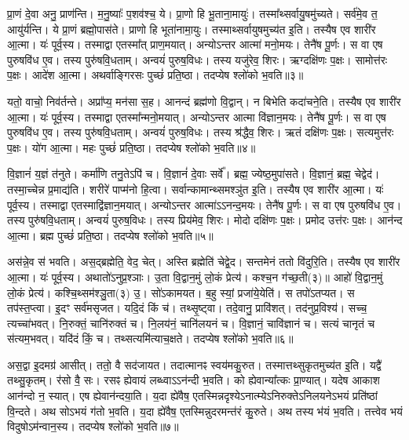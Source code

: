 प्रा॒णं दे॒वा अनु॒ प्राण॑न्ति। 
म॒नु॒ष्याः᳚ प॒शव॑श्च॒ ये। 
प्रा॒णो हि भू॒ताना॒मायुः॑। 
तस्मा᳚थ्सर्वायु॒षमु॑च्यते। 
सर्व॑मे॒व त॒ आयु॑र्\mbox{}यन्ति। 
ये प्रा॒णं ब्रह्मो॒पास॑ते। 
प्राणो हि भूता॑नामा॒युः। 
तस्माथ्सर्वायुषमुच्य॑त इ॒ति। 
तस्यैष एव शारी॑र आ॒त्मा। 
यः॑ पूर्व॒स्य। 
तस्माद्वा एतस्मा᳚त् प्राण॒मयात्। 
अन्योऽन्तर आत्मा॑ मनो॒मयः। 
तेनै॑ष पू॒र्णः। 
स वा एष पुरुषवि॑ध ए॒व। 
तस्य पुरु॑षवि॒धताम्। 
अन्वयं॑ पुरुष॒विधः। 
तस्य यजु॑रेव॒ शिरः। 
ऋग्दक्षि॑णः प॒क्षः। 
सामोत्त॑रः प॒क्षः। 
आदे॑श आ॒त्मा। 
अथर्वाङ्गिरसः पुच्छं॑ प्रति॒ष्ठा। 
तदप्येष श्लो॑को भ॒वति॥३॥

यतो॒ वाचो॒ निव॑र्तन्ते। 
अप्रा᳚प्य॒ मन॑सा स॒ह। 
आनन्दं ब्रह्म॑णो वि॒द्वान्। 
न बिभेति कदा॑चने॒ति। 
तस्यैष एव शारी॑र आ॒त्मा। 
यः॑ पूर्व॒स्य। 
तस्माद्वा एतस्मा᳚न्मनो॒मयात्। 
अन्योऽन्तर आत्मा वि॑ज्ञान॒मयः। 
तेनै॑ष पू॒र्णः। 
स वा एष पुरुषवि॑ध ए॒व। 
तस्य पुरु॑षवि॒धताम्। 
अन्वयं॑ पुरुष॒विधः। 
तस्य श्र॑द्धैव॒ शिरः। 
ऋतं दक्षि॑णः प॒क्षः। 
सत्यमुत्त॑रः प॒क्षः। 
यो॑ग आ॒त्मा। 
महः पुच्छं॑ प्रति॒ष्ठा। 
तदप्येष श्लो॑को भ॒वति॥४॥

वि॒ज्ञानं॑ य॒ज्ञं त॑नुते। 
कर्मा॑णि तनु॒तेऽपि॑ च। 
वि॒ज्ञानं॑ दे॒वाः सर्वे᳚। 
ब्रह्म॒ ज्येष्ठ॒मुपा॑सते। 
वि॒ज्ञानं॒ ब्रह्म॒ चेद्वेद॑। 
तस्मा॒च्चेन्न प्र॒माद्य॑ति। 
शरीरे॑ पाप्म॑नो हि॒त्वा। 
सर्वान्कामान्थ्समश्ञु॑त इ॒ति। 
तस्यैष एव शारी॑र आ॒त्मा। 
यः॑ पूर्व॒स्य। 
तस्माद्वा एतस्माद्वि॑ज्ञान॒मयात्। 
अन्योऽन्तर आत्मा॑ऽऽनन्द॒मयः। 
तेनै॑ष पू॒र्णः। 
स वा एष पुरुषवि॑ध ए॒व। 
तस्य पुरु॑षवि॒धताम्। 
अन्वयं॑ पुरुष॒विधः। 
तस्य प्रिय॑मेव॒ शिरः। 
मोदो दक्षि॑णः प॒क्षः। 
प्रमोद उत्त॑रः प॒क्षः। 
आन॑न्द आ॒त्मा। 
ब्रह्म पुच्छं॑ प्रति॒ष्ठा। 
तदप्येष श्लो॑को भ॒वति॥५॥

अस॑न्ने॒व स॑ भवति। 
अस॒द्ब्रह्मेति॒ वेद॒ चेत्। 
अस्ति ब्रह्मेति॑ चेद्वे॒द। 
सन्तमेनं ततो वि॑दुरि॒ति। 
तस्यैष एव शारी॑र आ॒त्मा। 
यः॑ पूर्व॒स्य। 
अथातो॑ऽनुप्र॒श्ञाः। 
उ॒ता वि॒द्वान॒मुं लो॒कं प्रेत्य॑। 
कश्च॒न ग॑च्छ॒ती(३)॥ आहो॑ वि॒द्वान॒मुं लो॒कं प्रेत्य॑। 
कश्चि॒थ्सम॑श्ञु॒ता(३) उ॒। 
सो॑ऽकामयत। 
ब॒हु स्यां॒ प्रजा॑ये॒येति॑। 
स तपो॑ऽतप्यत। 
स तप॑स्त॒प्त्वा। 
इ॒दꣳ सर्व॑मसृजत। 
यदि॒दं किं च॑। 
तथ्सृ॒ष्ट्वा। 
तदे॒वानु॒ प्रावि॑शत्। 
तद॑नुप्र॒विश्य॑। 
सच्च॒ त्यच्चा॑भवत्। 
नि॒रुक्तं॒ चानि॑रुक्तं च। 
नि॒लय॑नं॒ चानि॑लयनं च। 
वि॒ज्ञानं॒ चावि॑ज्ञानं च। 
सत्यं चानृतं च स॑त्यम॒भवत्। 
यदि॑दं किं॒ च। 
तथ्सत्यमि॑त्याच॒क्षते। 
तदप्येष श्लो॑को भ॒वति॥६॥

अस॒द्वा इ॒दमग्र॑ आसीत्। 
ततो॒ वै सद॑जायत। 
तदात्मानꣴ स्वय॑मकु॒रुत। 
तस्मात्तथ्सुकृतमुच्य॑त इ॒ति। 
यद्वै॑ तथ्सु॒कृतम्। 
र॑सो वै॒ सः। 
रसꣴ ह्येवायं लब्ध्वाऽऽन॑न्दी भ॒वति। 
को ह्येवान्या᳚त्कः प्रा॒ण्यात्। 
यदेष आकाश आन॑न्दो न॒ स्यात्। 
एष ह्येवान॑न्दया॒ति। 
य॒दा ह्ये॑वैष॒ एतस्मिन्नदृश्येऽनात्म्येऽनिरुक्तेऽनिलयनेऽभयं प्रति॑ष्ठां वि॒न्दते। 
अथ सोऽभयं ग॑तो भ॒वति। 
य॒दा ह्ये॑वैष॒ एतस्मिन्नुदरमन्त॑रं कु॒रुते। 
अथ तस्य भ॑यं भ॒वति। 
तत्त्वेव भयं विदुषोऽम॑न्वान॒स्य। 
तदप्येष श्लो॑को भ॒वति॥७॥

